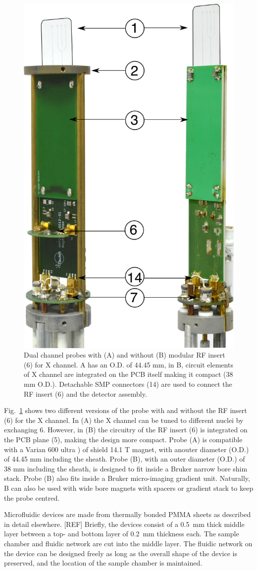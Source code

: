 \documentclass[preprint,5p]{elsarticle}
\newcommand{\fig}[1]{Fig.~\ref{#1}}
\begin{document}
\begin{figure}
\centering
\includegraphics[width=.5\linewidth,keepaspectratio=true]{./figures/ms5n17-tlp-im-181007-both-detectors.png}
\caption{Dual channel probes with (A) and without (B) modular RF insert (6) for X channel. 
A has an O.D. of 44.45 mm, in B, circuit elements of X channel are integrated on the 
PCB itself making it compact (38 mm O.D.). Detachable SMP connectors (14) are used to 
connect the RF insert (6) and the detector assembly. }
\label{fig:ProbePhoto}
\end{figure}
\fig{fig:ProbePhoto} shows two different versions of the probe with and without the RF insert (6) 
for the X channel. In (A) the X channel can be tuned to different nuclei by exchanging 6. 
However, in (B) the circuitry of the RF insert (6) is integrated on the PCB plane (5), 
making the design more compact.
 Probe (A) is compatible with a Varian 600 ultra ) of
shield 14.1 T magnet, with anouter diameter (O.D.) of 44.45 mm including the sheath. Probe (B), with an 
outer diameter (O.D.) of 38 mm including the sheath, is designed to fit inside a 
Bruker narrow bore shim stack. 
Probe (B) also fits inside a Bruker micro-imaging gradient unit. Naturally, B can also be used with 
wide bore magnets with spacers or gradient stack to keep the probe centred.

Microfluidic devices are made from thermally bonded PMMA sheets as described in detail elsewhere. [REF]
Briefly, the devices consist of a 0.5~mm thick middle layer between a top- and bottom layer of 
0.2~mm thickness each. The sample chamber and fluidic network are cut into the middle layer.
The fluidic network on the device can be designed freely as long as the overall shape of the
device is preserved, and the location of the sample chamber is maintained.
\end{document}
